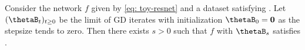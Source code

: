 

\begin{theorem}
\label{thm: Near-two homogeneous example achieves init bound}
Consider the network $f$ given by \eqref{eq: toy-resnet} and a dataset satisfying .
Let 
$(\thetaB_t)_{t\ge 0}$ be the limit of GD iterates with initialization $\thetaB_0=\boldsymbol 0$ as the stepsize tends to zero. 
Then there exists $s>0$ such that $f$ with $\thetaB_s$ satisfies .
\end{theorem}

